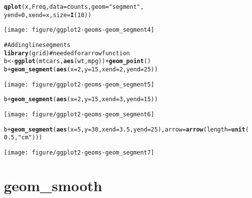 \documentclass[a4paper,titlepage]{tufte-handout}\usepackage{graphicx, color}
\makeatletter
\def\maxwidth{ %
  \ifdim\Gin@nat@width>\linewidth
    \linewidth
  \else
    \Gin@nat@width
  \fi
}
\newcommand{\hlfunctioncall}[1]{\textcolor[rgb]{0.501960784313725,0,0.329411764705882}{\textbf{#1}}}%
\newcommand{\hlstring}[1]{\textcolor[rgb]{0.6,0.6,1}{#1}}%
\newcommand{\hlcomment}[1]{\textcolor[rgb]{0.180392156862745,0.6,0.341176470588235}{#1}}%
\newenvironment{kframe}{%
 \def\at@end@of@kframe{}%
 \ifinner\ifhmode%
  \def\at@end@of@kframe{\end{minipage}}%
  \begin{minipage}{\columnwidth}%
 \fi\fi%
 \def\FrameCommand##1{\hskip\@totalleftmargin \hskip-\fboxsep
 \colorbox{shadecolor}{##1}\hskip-\fboxsep
     \hskip-\linewidth \hskip-\@totalleftmargin \hskip\columnwidth}%
 \MakeFramed {\advance\hsize-\width
   \@totalleftmargin\z@ \linewidth\hsize
   \@setminipage}}%
 {\par\unskip\endMakeFramed%
 \at@end@of@kframe}
\newenvironment{knitrout}{}{} %
\makeatother
\begin{document}
\begin{knitrout}
\begin{kframe}
\begin{alltt}
\hlfunctioncall{qplot}(x, Freq, data = counts, geom = \hlstring{"segment"},
  yend = 0, xend = x, size = \hlfunctioncall{I}(10))
\end{alltt}
\end{kframe}\texttt{[image: figure/ggplot2-geoms-geom\_segment4]} \begin{kframe}\begin{alltt}
\hlcomment{# Adding line segments}
\hlfunctioncall{library}(grid) \hlcomment{# needed for arrow function}
b <- \hlfunctioncall{ggplot}(mtcars, \hlfunctioncall{aes}(wt, mpg)) + \hlfunctioncall{geom_point}()
b + \hlfunctioncall{geom_segment}(\hlfunctioncall{aes}(x = 2, y = 15, xend = 2, yend = 25))
\end{alltt}
\end{kframe}\texttt{[image: figure/ggplot2-geoms-geom\_segment5]} \begin{kframe}\begin{alltt}
b + \hlfunctioncall{geom_segment}(\hlfunctioncall{aes}(x = 2, y = 15, xend = 3, yend = 15))
\end{alltt}
\end{kframe}\texttt{[image: figure/ggplot2-geoms-geom\_segment6]} \begin{kframe}\begin{alltt}
b + \hlfunctioncall{geom_segment}(\hlfunctioncall{aes}(x = 5, y = 30, xend = 3.5, yend = 25), arrow = \hlfunctioncall{arrow}(length = \hlfunctioncall{unit}(0.5, \hlstring{"cm"})))
\end{alltt}
\end{kframe}\texttt{[image: figure/ggplot2-geoms-geom\_segment7]} 
\end{knitrout}


\section{geom\_smooth}
\end{document}
